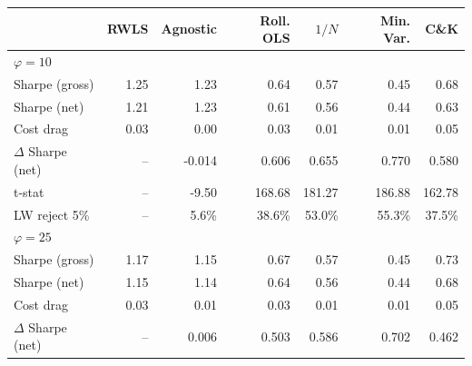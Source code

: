 \begin{tabular*}{\textwidth}{l@{\extracolsep{\fill}}rrrrrr}
\toprule
 & RWLS & Agnostic & Roll. OLS & $1/N$ & Min. Var. & C\&K \\
\midrule
\multicolumn{7}{l}{\textit{$\varphi = 10$}} \\
\midrule
Sharpe (gross) & 1.25\phantom{$^{***}$} & 1.23\phantom{$^{***}$} & 0.64\phantom{$^{***}$} & 0.57\phantom{$^{***}$} & 0.45\phantom{$^{***}$} & 0.68\phantom{$^{***}$} \\
Sharpe (net) & 1.21\phantom{$^{***}$} & 1.23\phantom{$^{***}$} & 0.61\phantom{$^{***}$} & 0.56\phantom{$^{***}$} & 0.44\phantom{$^{***}$} & 0.63\phantom{$^{***}$} \\
Cost drag & 0.03\phantom{$^{***}$} & 0.00\phantom{$^{***}$} & 0.03\phantom{$^{***}$} & 0.01\phantom{$^{***}$} & 0.01\phantom{$^{***}$} & 0.05\phantom{$^{***}$} \\
$\Delta$ Sharpe (net) & --\phantom{$^{***}$} & -0.014\rlap{$^{***}$}\phantom{$^{***}$} & 0.606\rlap{$^{***}$}\phantom{$^{***}$} & 0.655\rlap{$^{***}$}\phantom{$^{***}$} & 0.770\rlap{$^{***}$}\phantom{$^{***}$} & 0.580\rlap{$^{***}$}\phantom{$^{***}$} \\
t-stat & --\phantom{$^{***}$} & -9.50\phantom{$^{***}$} & 168.68\phantom{$^{***}$} & 181.27\phantom{$^{***}$} & 186.88\phantom{$^{***}$} & 162.78\phantom{$^{***}$} \\
LW reject 5\% & --\phantom{$^{***}$} & 5.6\%\phantom{$^{***}$} & 38.6\%\phantom{$^{***}$} & 53.0\%\phantom{$^{***}$} & 55.3\%\phantom{$^{***}$} & 37.5\%\phantom{$^{***}$} \\
\midrule
\multicolumn{7}{l}{\textit{$\varphi = 25$}} \\
\midrule
Sharpe (gross) & 1.17\phantom{$^{***}$} & 1.15\phantom{$^{***}$} & 0.67\phantom{$^{***}$} & 0.57\phantom{$^{***}$} & 0.45\phantom{$^{***}$} & 0.73\phantom{$^{***}$} \\
Sharpe (net) & 1.15\phantom{$^{***}$} & 1.14\phantom{$^{***}$} & 0.64\phantom{$^{***}$} & 0.56\phantom{$^{***}$} & 0.44\phantom{$^{***}$} & 0.68\phantom{$^{***}$} \\
Cost drag & 0.03\phantom{$^{***}$} & 0.01\phantom{$^{***}$} & 0.03\phantom{$^{***}$} & 0.01\phantom{$^{***}$} & 0.01\phantom{$^{***}$} & 0.05\phantom{$^{***}$} \\
$\Delta$ Sharpe (net) & --\phantom{$^{***}$} & 0.006\rlap{$^{***}$}\phantom{$^{***}$} & 0.503\rlap{$^{***}$}\phantom{$^{***}$} & 0.586\rlap{$^{***}$}\phantom{$^{***}$} & 0.702\rlap{$^{***}$}\phantom{$^{***}$} & 0.462\rlap{$^{***}$}\phantom{$^{***}$} \\

\end{tabular*}
